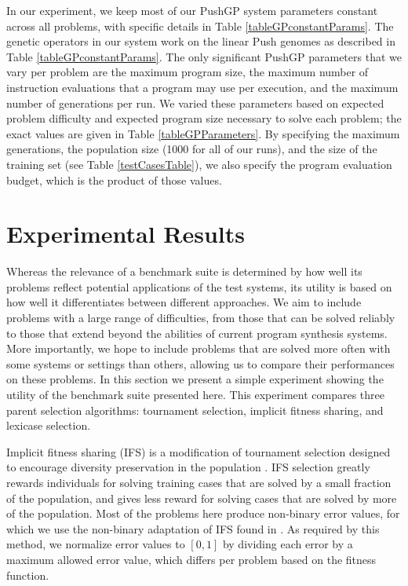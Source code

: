 \documentclass{sig-alternate}
\begin{document}
In our experiment, we keep most of our PushGP system parameters constant across all problems, with specific details in Table \ref{tableGPconstantParams}. The genetic operators in our system work on the linear Push genomes as described in Table \ref{tableGPconstantParams}.
The only significant PushGP parameters that we vary per problem are the maximum program size, the maximum number of instruction evaluations that a program may use per execution, and the maximum number of generations per run. We varied these parameters based on expected problem difficulty and expected program size necessary to solve each problem; the exact values are given in Table \ref{tableGPParameters}. By specifying the maximum generations, the population size (1000 for all of our runs), and the size of the training set (see Table \ref{testCasesTable}), we also specify the program evaluation budget, which is the product of those values.


\section{Experimental Results}

Whereas the relevance of a benchmark suite is determined by how well its problems reflect potential applications of the test systems, its utility is based on how well it differentiates between different approaches. We aim to include problems with a large range of difficulties, from those that can be solved reliably to those that extend beyond the abilities of current program synthesis systems. More importantly, we hope to include problems that are solved more often with some systems or settings than others, allowing us to compare their performances on these problems.
In this section we present a simple experiment showing the utility of the benchmark suite presented here. This experiment compares three parent selection algorithms: tournament selection, implicit fitness sharing, and lexicase selection.

Implicit fitness sharing (IFS) is a modification of tournament selection designed to encourage diversity preservation in the population \cite{McKay:2000:GECCO}. IFS selection greatly rewards individuals for solving training cases that are solved by a small fraction of the population, and gives less reward for solving cases that are solved by more of the population. Most of the problems here produce non-binary error values, for which we use the non-binary adaptation of IFS found in \cite{Krawiec:2013:EvoIASP}. As required by this method, we normalize error values to $[0, 1]$ by dividing each error by a maximum allowed error value, which differs per problem based on the fitness function.
\end{document}
